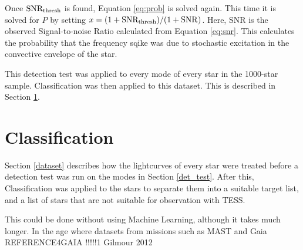 \documentclass[a4paper,fleqn,usenatbib,useAMS]{mnras}
\begin{document}
Once $\rm SNR_{thresh}$ is found, Equation \ref{eq:prob} is solved again. This time it is solved for $P$ by setting $x=(1+{\rm SNR_{thresh}})/(1+{\rm SNR})$. Here, SNR is the observed Signal-to-noise Ratio calculated from Equation \ref{eq:snr}. This calculates the probability that the frequency sqike was due to stochastic excitation in the convective envelope of the star.

This detection test was applied to every mode of every star in the 1000-star sample. Classification was then applied to this dataset. This is described in Section \ref{classifier}.


\section{Classification}
\label{classifier}

Section \ref{dataset} describes how the lightcurves of every star were treated before a detection test was run on the modes in Section \ref{det_test}. After this, Classification was applied to the stars to separate them into a suitable target list, and a list of stars that are not suitable for observation with TESS.

This could be done without using Machine Learning, although it takes much longer. In the age where datasets from missions such as MAST and Gaia REFERENCE4GAIA !!!!!1 Gilmour 2012  




\bsp
\label{lastpage}
\end{document}
